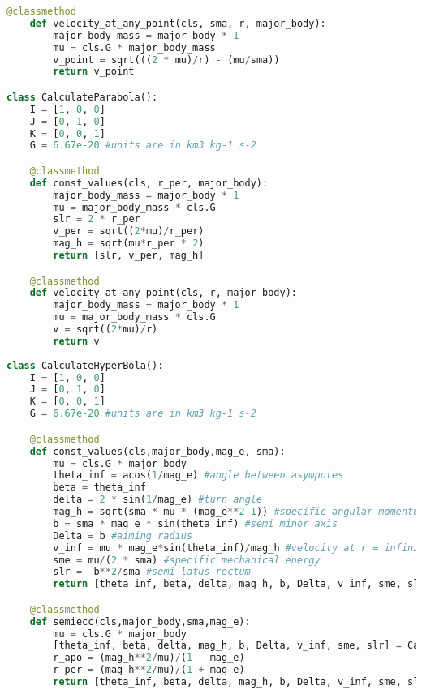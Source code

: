 \begin{lstlisting}[language=python, caption=VPCO]
    @classmethod
    def velocity_at_any_point(cls, sma, r, major_body):
        major_body_mass = major_body * 1
        mu = cls.G * major_body_mass
        v_point = sqrt(((2 * mu)/r) - (mu/sma))
        return v_point

class CalculateParabola():
    I = [1, 0, 0]
    J = [0, 1, 0]
    K = [0, 0, 1]
    G = 6.67e-20 #units are in km3 kg-1 s-2

    @classmethod
    def const_values(cls, r_per, major_body):
        major_body_mass = major_body * 1
        mu = major_body_mass * cls.G
        slr = 2 * r_per
        v_per = sqrt((2*mu)/r_per)
        mag_h = sqrt(mu*r_per * 2)
        return [slr, v_per, mag_h]

    @classmethod
    def velocity_at_any_point(cls, r, major_body):
        major_body_mass = major_body * 1
        mu = major_body_mass * cls.G
        v = sqrt((2*mu)/r)
        return v
    
class CalculateHyperBola():
    I = [1, 0, 0]
    J = [0, 1, 0]
    K = [0, 0, 1]
    G = 6.67e-20 #units are in km3 kg-1 s-2

    @classmethod
    def const_values(cls,major_body,mag_e, sma):
        mu = cls.G * major_body
        theta_inf = acos(1/mag_e) #angle between asympotes
        beta = theta_inf 
        delta = 2 * sin(1/mag_e) #turn angle
        mag_h = sqrt(sma * mu * (mag_e**2-1)) #specific angular momentum
        b = sma * mag_e * sin(theta_inf) #semi minor axis
        Delta = b #aiming radius
        v_inf = mu * mag_e*sin(theta_inf)/mag_h #velocity at r = infinity
        sme = mu/(2 * sma) #specific mechanical energy
        slr = -b**2/sma #semi latus rectum
        return [theta_inf, beta, delta, mag_h, b, Delta, v_inf, sme, slr]

    @classmethod
    def semiecc(cls,major_body,sma,mag_e):
        mu = cls.G * major_body
        [theta_inf, beta, delta, mag_h, b, Delta, v_inf, sme, slr] = CalculateHyperBola.const_values(major_body, sma, mag_e)
        r_apo = (mag_h**2/mu)/(1 - mag_e)
        r_per = (mag_h**2/mu)/(1 + mag_e)
        return [theta_inf, beta, delta, mag_h, b, Delta, v_inf, sme, slr, r_apo, r_per]
\end{lstlisting}
